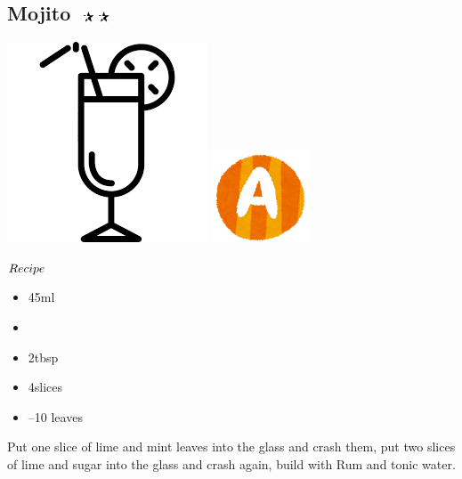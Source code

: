 \subsection{Mojito $\openbigstar\openbigstar$}
\vspace{-7.5mm}
\hspace{34mm}
\includegraphics[scale=.07]{cocktail_glass_tall.png}
\includegraphics[scale=.12]{capital_a.png}
\vspace{2.5mm}
\begin{itembox}[l]{\boldmath $Recipe$}
\begin{itemize}
\setlength{\parskip}{0cm}
\setlength{\itemsep}{0cm}
\item \rum 45ml
\item \tw
\item \sugar 2tbsp
\item \lime 4slices
\item {}--10 leaves
\end{itemize}
\vspace{-4mm}
Put one slice of lime and mint leaves into the glass and crash them, put two slices of lime and sugar into the glass and crash again, build with Rum and tonic water.
\end{itembox}

